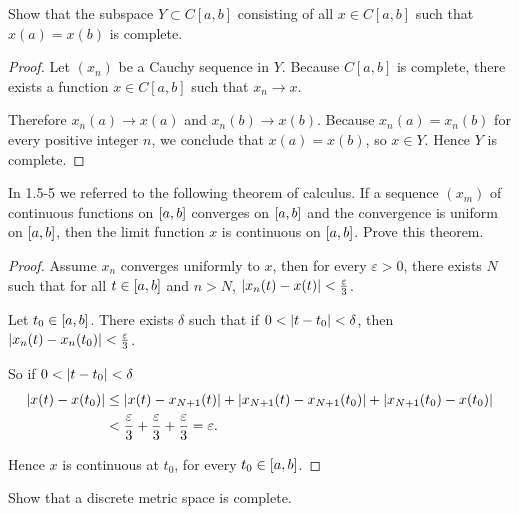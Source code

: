 \begin{exercise}\label{chapter1:section5:exercise8}
    Show that the subspace $Y\subset C[a, b]$ consisting of all $x\in C[a, b]$ such that $x(a) = x(b)$ is complete.
\end{exercise}

\begin{proof}
    Let ${(x_{n})}$ be a Cauchy sequence in $Y$. Because $C[a, b]$ is complete, there exists a function $x\in C[a, b]$ such that $x_{n}\to x$.

    Therefore $x_{n}(a)\to x(a)$ and $x_{n}(b)\to x(b)$. Because $x_{n}(a) = x_{n}(b)$ for every positive integer $n$, we conclude that $x(a) = x(b)$, so $x\in Y$. Hence $Y$ is complete.
\end{proof}

\begin{exercise}\label{chapter1:section5:exercise9}
    In 1.5-5 we referred to the following theorem of calculus. If a sequence $(x_{m})$ of continuous functions on $\left[{a, b}\right]$ converges on $\left[{a, b}\right]$ and the convergence is uniform on $\left[{a, b}\right]$, then the limit function $x$ is continuous on $\left[{a, b}\right]$. Prove this theorem.
\end{exercise}

\begin{proof}
    Assume $x_{n}$ converges uniformly to $x$, then for every $\varepsilon > 0$, there exists $N$ such that for all $t\in \left[{a, b}\right]$ and $n > N$, $\left\vert{x_{n}(t) - x(t)}\right\vert < \frac{\varepsilon}{3}$.

    Let $t_{0}\in \left[{a, b}\right]$. There exists $\delta$ such that if $0 < \left\vert{t - t_{0}}\right\vert < \delta$, then $\left\vert{x_{n}(t) - x_{n}(t_{0})}\right\vert < \frac{\varepsilon}{3}$.

    So if $0 < \left\vert{t - t_{0}}\right\vert < \delta$
    \begin{align*}
        \left\vert{x(t) - x(t_{0})}\right\vert & \leq \left\vert{x(t) - x_{N+1}(t)}\right\vert + \left\vert{x_{N+1}(t) - x_{N+1}(t_{0})}\right\vert + \left\vert{x_{N+1}(t_{0}) - x(t_{0})}\right\vert \\
                              & < \frac{\varepsilon}{3} + \frac{\varepsilon}{3} + \frac{\varepsilon}{3} = \varepsilon.
    \end{align*}

    Hence $x$ is continuous at $t_{0}$, for every $t_{0}\in \left[{a, b}\right]$.
\end{proof}


\begin{exercise}\label{chapter1:section5:exercise10}
    Show that a discrete metric space is complete.
\end{exercise}

